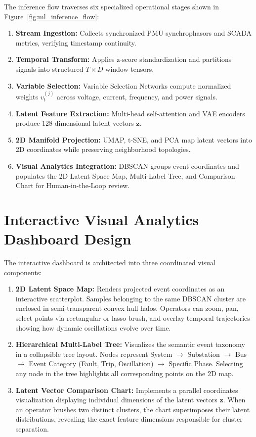 \documentclass[12pt,a4paper]{report}
\begin{document}
The inference flow traverses six specialized operational stages shown in Figure~\ref{fig:ml_inference_flow}:
\begin{enumerate}
    \item \textbf{Stream Ingestion:} Collects synchronized PMU synchrophasors and SCADA metrics, verifying timestamp continuity.
    \item \textbf{Temporal Transform:} Applies z-score standardization and partitions signals into structured $T \times D$ window tensors.
    \item \textbf{Variable Selection:} Variable Selection Networks compute normalized weights $v_t^{(j)}$ across voltage, current, frequency, and power signals.
    \item \textbf{Latent Feature Extraction:} Multi-head self-attention and VAE encoders produce 128-dimensional latent vectors $\mathbf{z}$.
    \item \textbf{2D Manifold Projection:} UMAP, t-SNE, and PCA map latent vectors into 2D coordinates while preserving neighborhood topologies.
    \item \textbf{Visual Analytics Integration:} DBSCAN groups event coordinates and populates the 2D Latent Space Map, Multi-Label Tree, and Comparison Chart for Human-in-the-Loop review.
\end{enumerate}

\section{Interactive Visual Analytics Dashboard Design}
The interactive dashboard is architected into three coordinated visual components:
\begin{enumerate}
    \item \textbf{2D Latent Space Map:} Renders projected event coordinates as an interactive scatterplot. Samples belonging to the same DBSCAN cluster are enclosed in semi-transparent convex hull halos. Operators can zoom, pan, select points via rectangular or lasso brush, and overlay temporal trajectories showing how dynamic oscillations evolve over time.
    \item \textbf{Hierarchical Multi-Label Tree:} Visualizes the semantic event taxonomy in a collapsible tree layout. Nodes represent System $\to$ Substation $\to$ Bus $\to$ Event Category (Fault, Trip, Oscillation) $\to$ Specific Phase. Selecting any node in the tree highlights all corresponding points on the 2D map.
    \item \textbf{Latent Vector Comparison Chart:} Implements a parallel coordinates visualization displaying individual dimensions of the latent vectors $\mathbf{z}$. When an operator brushes two distinct clusters, the chart superimposes their latent distributions, revealing the exact feature dimensions responsible for cluster separation.
\end{enumerate}
\end{document}
